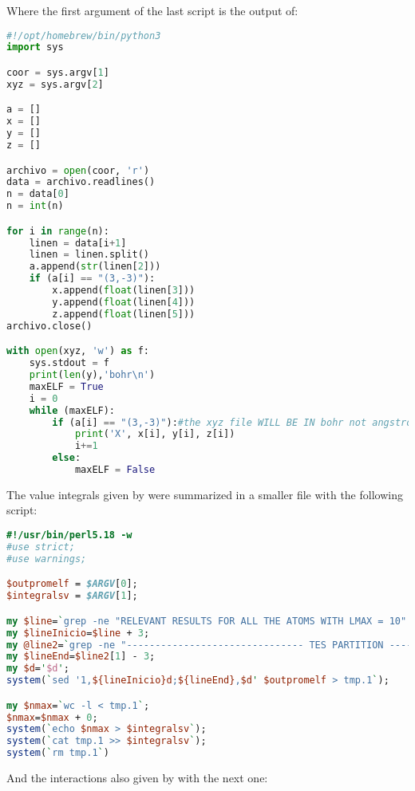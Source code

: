 Where the first argument of the last script is the output of:

\begin{lstlisting}[language=Python]
#!/opt/homebrew/bin/python3
import sys

coor = sys.argv[1]
xyz = sys.argv[2]

a = []
x = []
y = []
z = []

archivo = open(coor, 'r')
data = archivo.readlines()
n = data[0]
n = int(n)

for i in range(n):
	linen = data[i+1]
	linen = linen.split()
	a.append(str(linen[2]))
	if (a[i] == "(3,-3)"):
		x.append(float(linen[3]))
		y.append(float(linen[4]))
		z.append(float(linen[5]))
archivo.close()

with open(xyz, 'w') as f:
	sys.stdout = f
	print(len(y),'bohr\n')
	maxELF = True
	i = 0
	while (maxELF):
		if (a[i] == "(3,-3)"):#the xyz file WILL BE IN bohr not angstrom
			print('X', x[i], y[i], z[i])
			i+=1
		else:
			maxELF = False
\end{lstlisting}

The value integrals given by {} were summarized in a smaller
file with the following script:

\begin{lstlisting}[language=perl]
#!/usr/bin/perl5.18 -w
#use strict;
#use warnings;

$outpromelf = $ARGV[0];
$integralsv = $ARGV[1];

my $line=`grep -ne "RELEVANT RESULTS FOR ALL THE ATOMS WITH LMAX = 10" $outpromelf | cut -f1 -d:`;
my $lineInicio=$line + 3;
my @line2=`grep -ne "------------------------------- TES PARTITION ---------------------------------" $outpromelf | cut -f1 -d:`;
my $lineEnd=$line2[1] - 3;
my $d='$d';
system(`sed '1,${lineInicio}d;${lineEnd},$d' $outpromelf > tmp.1`);

my $nmax=`wc -l < tmp.1`;
$nmax=$nmax + 0;
system(`echo $nmax > $integralsv`);
system(`cat tmp.1 >> $integralsv`);
system(`rm tmp.1`)
\end{lstlisting}

And the interactions also given by {} with the next one:

